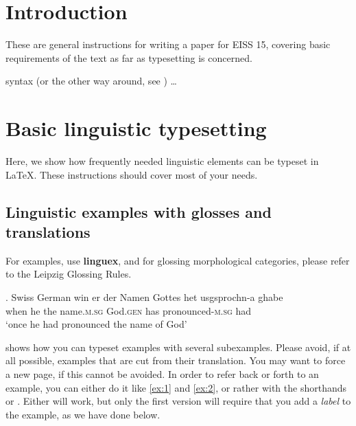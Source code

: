 



\section{Introduction}\label{sec:1}

These are general instructions for writing a paper for EISS 15, covering basic requirements of the text as far as typesetting is concerned.

syntax (or the other way around, see \citealt{Kamp:1973,Searle:1964}) \ldots 

\section{Basic linguistic typesetting}

Here, we show how frequently needed linguistic elements can be typeset in \LaTeX. These instructions should cover most of your needs. 

\subsection{Linguistic examples with glosses and translations}

For examples, use \textbf{linguex}, and for glossing morphological categories, please refer to the Leipzig Glossing Rules.

\ex. Swiss German \citep[][346]{hodler69}
\gll win er der Namen Gottes het usgsprochn-a ghabe\\
when he the name.\textsc{m.sg} God.\textsc{gen} has pronounced-\textsc{m.sg} had\\
`once he had pronounced the name of God'

\Next shows how you can typeset examples with several subexamples. Please avoid, if at all possible, examples that are cut from their translation. You may want to force a new page, if this cannot be avoided. In order to refer back or forth to an example, you can either do it like \ref{ex:1} and \ref{ex:2}, or rather with the shorthands \Next[c] or \Last. Either will work, but only the first version will require that you add a \emph{label} to the example, as we have done below.



